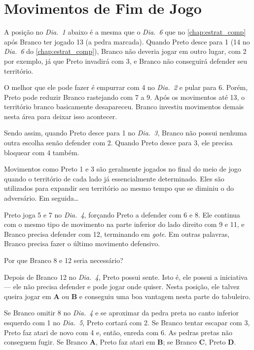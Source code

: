 \chapter{Movimentos de Fim de Jogo}

A posição no \emph{Dia.\@~1} abaixo é a mesma que o \emph{Dia.\@~6} que no \autoref{chap:estrat_comp} após Branco ter jogado 13 (a pedra marcada). Quando Preto desce para 1 (14 no \emph{Dia.\@~6} do \autoref{chap:estrat_comp}), Branco não deveria jogar em outro lugar, com 2 por exemplo, já que Preto invadirá com 3, e Branco não conseguirá defender seu território.

O melhor que ele pode fazer é empurrar com 4 no \emph{Dia.\@~2} e pular para 6. Porém, Preto pode reduzir Branco rastejando com 7 a 9. Após os movimentos até 13, o território branco basicamente desapareceu. Branco investiu movimentos demais nesta área para deixar isso acontecer.

Sendo assim, quando Preto desce para 1 no \emph{Dia.\@~3}, Branco não possui nenhuma outra escolha senão defender com 2. Quando Preto desce para 3, ele precisa bloquear com 4 também.

Movimentos como Preto 1 e 3 são geralmente jogados no final do meio de jogo quando o território de cada lado já essencialmente determinado. Eles são utilizados para expandir seu território ao mesmo tempo que se diminiu o do adversário. Em seguida\ldots

Preto joga 5 e 7 no \emph{Dia.\@~4}, forçando Preto a defender com 6 e 8. Ele continua com o mesmo tipo de movimento na parte inferior do lado direito com 9 e 11, e Branco precisa defender com 12, terminando em \emph{gote}. Em outras palavras, Branco precisa fazer o último movimento defensivo.

Por que Branco 8 e 12 seria necessário?

Depois de Branco 12 no \emph{Dia.\@~4}, Preto possui sente. Isto é, ele possui a iniciativa --- ele não precisa defender e pode jogar onde quiser. Nesta posição, ele talvez queira jogar em \textbf{A} ou \textbf{B} e conseguiu uma boa vantagem nesta parte do tabuleiro.

Se Branco omitir 8 no \emph{Dia.\@~4} e se aproximar da pedra preta no canto inferior esquerdo com 1 no \emph{Dia.\@~5}, Preto cortará com 2. Se Branco tentar escapar com 3, Preto faz atari de novo com 4 e, então, enreda com 6. As pedras pretas não conseguem fugir. Se Branco \textbf{A}, Preto faz atari em \textbf{B}; se Branco \textbf{C}, Preto \textbf{D}.

